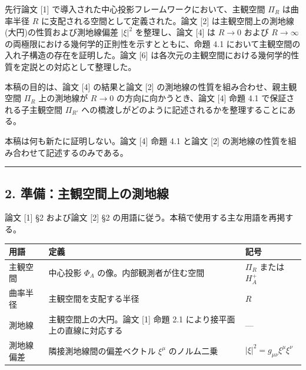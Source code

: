 \documentclass[a4paper,11pt]{ltjsarticle}
\theoremstyle{definition}
\begin{document}
先行論文 {[}1{]} で導入された中心投影フレームワークにおいて、主観空間 \(\Pi_R\) は曲率半径 \(R\) に支配される空間として定義された。論文 {[}2{]} は主観空間上の測地線(大円)の性質および測地線偏差 \(|\xi|^2\) を整理し、論文 {[}4{]} は \(R \to 0\) および \(R \to \infty\) の両極限における幾何学的正則性を示すとともに、命題 4.1 において主観空間の入れ子構造の存在を証明した。論文 {[}6{]} は各次元の主観空間における幾何学的性質を定説との対応として整理した。

本稿の目的は、論文 {[}4{]} の結果と論文 {[}2{]} の測地線の性質を組み合わせ、親主観空間 \(\Pi_R\) 上の測地線が \(R \to 0\) の方向に向かうとき、論文 {[}4{]} 命題 4.1 で保証される子主観空間 \(\Pi_{R'}\) への橋渡しがどのように記述されるかを整理することにある。

本稿は何も新たに証明しない。論文 {[}4{]} 命題 4.1 と論文 {[}2{]} の測地線の性質を組み合わせて記述するのみである。

\begin{center}\rule{0.5\linewidth}{0.5pt}\end{center}

\subsection{2. 準備：主観空間上の測地線}\label{ux6e96ux5099ux4e3bux89b3ux7a7aux9593ux4e0aux306eux6e2cux5730ux7dda}

論文 {[}1{]} §2 および論文 {[}2{]} §2 の用語に従う。本稿で使用する主な用語を再掲する。

{\def\LTcaptype{none} %
\begin{longtable}[]{@{}
  >{\raggedright\arraybackslash}p{}
  >{\raggedright\arraybackslash}p{}
  >{\raggedright\arraybackslash}p{}@{}}
\toprule\noalign{}
\begin{minipage}[b]{\linewidth}\raggedright
用語
\end{minipage} & \begin{minipage}[b]{\linewidth}\raggedright
定義
\end{minipage} & \begin{minipage}[b]{\linewidth}\raggedright
記号
\end{minipage} \\
\midrule\noalign{}
\endhead
\bottomrule\noalign{}
\endlastfoot
主観空間 & 中心投影 \(\Phi_A\) の像。内部観測者が住む空間 & \(\Pi_R\) または \(H^+_A\) \\
曲率半径 & 主観空間を支配する半径 & \(R\) \\
測地線 & 主観空間上の大円。論文 {[}1{]} 命題 2.1 により接平面上の直線に対応する & --- \\
測地線偏差 & 隣接測地線間の偏差ベクトル \(\xi^\mu\) のノルム二乗 & \(\vert\xi\vert^2 = g_{\mu\nu}\xi^\mu\xi^\nu\) \\
\end{longtable}
}
\end{document}
